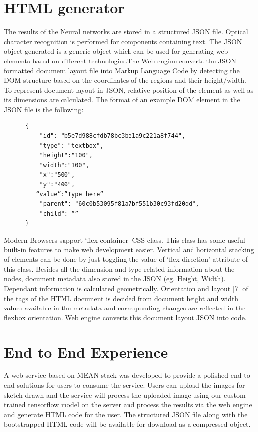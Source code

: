       \section{HTML generator}
      The results of the Neural networks are stored in a structured JSON file. Optical character recognition is performed for components containing text. The JSON object generated is a generic object which can be used for generating web elements based on different technologies.The Web engine converts the JSON formatted document layout file into Markup Language Code by detecting the DOM structure based on the coordinates of the regions and their height/width. To represent document layout in JSON, relative position of the element as well as its dimensions are calculated.
      The format of an example DOM element in the JSON file is the following:
      \begin{verbatim}
      {
          "id": "b5e7d988cfdb78bc3be1a9c221a8f744",
          "type": "textbox",
          "height":"100",
          "width":"100",
          "x":"500",
          "y":"400",
         “value”:”Type here”
          "parent": "60c0b53095f81a7bf551b30c93fd20dd",
          "child": “”
      }
      \end{verbatim}
      Modern Browsers support ‘flex-container’ CSS class. This class has some useful built-in features to make web development easier. Vertical and horizontal stacking of elements can be done by just toggling the value of ‘flex-direction’ attribute of this class.
      Besides all the dimension and type related information about the nodes, document metadata also stored in the JSON (eg. Height, Width). Dependant information is calculated geometrically. Orientation and layout [7] of the tags of the HTML document is decided from document height and width values available in the metadata and corresponding changes are reflected in the flexbox orientation. Web engine converts this document layout JSON into code.

      \section{End to End Experience}
        A web service based on MEAN stack was developed to provide a polished end to end solutions for users to consume the service. Users can upload the images for sketch drawn and the service will process the uploaded image using our custom trained tensorflow model on the server and process the results via the web engine and generate HTML code for the user. The structured JSON file along with the bootstrapped HTML code will be available for download as a compressed object.







